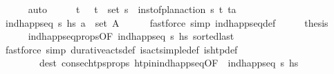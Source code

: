 \begin{isabellebody}
\ \ \ \ \isamarkupfalse%
\ auto\isanewline
\ \ \isamarkupfalse%
\ \isamarkupfalse%
\ t\isactrlsub {\isasympi}\ {\isasympi}\ \ {\isachardoublequoteopen}{\isacharparenleft}{\kern0pt}t\isactrlsub {\isasympi}{\isacharcomma}{\kern0pt}{\isasympi}{\isacharparenright}{\kern0pt}\ {\isasymin}\ set\ {\isasympi}s{\isachardoublequoteclose}\ \ {\isachardoublequoteopen}inst{\isacharunderscore}{\kern0pt}of{\isacharunderscore}{\kern0pt}plan{\isacharunderscore}{\kern0pt}action\ {\isasympi}s\ {\isacharparenleft}{\kern0pt}t\isactrlsub {\isasympi}{\isacharcomma}{\kern0pt}{\isasympi}{\isacharparenright}{\kern0pt}\ {\isacharparenleft}{\kern0pt}t{\isacharcomma}{\kern0pt}a{\isacharparenright}{\kern0pt}{\isachardoublequoteclose}\isanewline
\ \ \ \ \isamarkupfalse%
\ {\isacartoucheopen}ind{\isacharunderscore}{\kern0pt}happ{\isacharunderscore}{\kern0pt}seq\ {\isasympi}s\ hs{\isacartoucheclose}\ {\isacartoucheopen}a\ {\isasymin}\ set\ A{\isacartoucheclose}\isanewline
\ \ \ \ \isamarkupfalse%
\ {\isacharparenleft}{\kern0pt}fastforce\ simp{\isacharcolon}{\kern0pt}\ ind{\isacharunderscore}{\kern0pt}happ{\isacharunderscore}{\kern0pt}seq{\isacharunderscore}{\kern0pt}def{\isacharparenright}{\kern0pt}\isanewline
\ \ \isamarkupfalse%
\ \isamarkupfalse%
\ {\isacharquery}{\kern0pt}thesis\isanewline
\ \ \ \ \isamarkupfalse%
\ ind{\isacharunderscore}{\kern0pt}happ{\isacharunderscore}{\kern0pt}seq{\isacharunderscore}{\kern0pt}props{\isacharparenleft}{\kern0pt}{}{\isacharparenright}{\kern0pt}{\isacharbrackleft}{\kern0pt}OF\ {\isacartoucheopen}ind{\isacharunderscore}{\kern0pt}happ{\isacharunderscore}{\kern0pt}seq\ {\isasympi}s\ hs{\isacartoucheclose}{\isacharbrackright}{\kern0pt}\ sorted{\isacharunderscore}{\kern0pt}last\isanewline
\ \ \ \ \isamarkupfalse%
\ {\isacharparenleft}{\kern0pt}fastforce\ simp{\isacharcolon}{\kern0pt}\ durative{\isacharunderscore}{\kern0pt}acts{\isacharunderscore}{\kern0pt}def\ is{\isacharunderscore}{\kern0pt}act{\isacharunderscore}{\kern0pt}simple{\isacharunderscore}{\kern0pt}def\ is{\isacharunderscore}{\kern0pt}htp{\isacharunderscore}{\kern0pt}def\isanewline
\ \ \ \ \ \ \ \ dest{\isacharbang}{\kern0pt}{\isacharcolon}{\kern0pt}\ consec{\isacharunderscore}{\kern0pt}htps{\isacharunderscore}{\kern0pt}props{\isacharparenleft}{\kern0pt}{}{\isacharparenright}{\kern0pt}\ htp{\isacharunderscore}{\kern0pt}in{\isacharunderscore}{\kern0pt}ind{\isacharunderscore}{\kern0pt}happ{\isacharunderscore}{\kern0pt}seq{\isacharbrackleft}{\kern0pt}OF\ {\isacharunderscore}{\kern0pt}\ {\isacartoucheopen}ind{\isacharunderscore}{\kern0pt}happ{\isacharunderscore}{\kern0pt}seq\ {\isasympi}s\ hs{\isacartoucheclose}{\isacharbrackright}{\kern0pt}\isanewline

\end{isabellebody}
